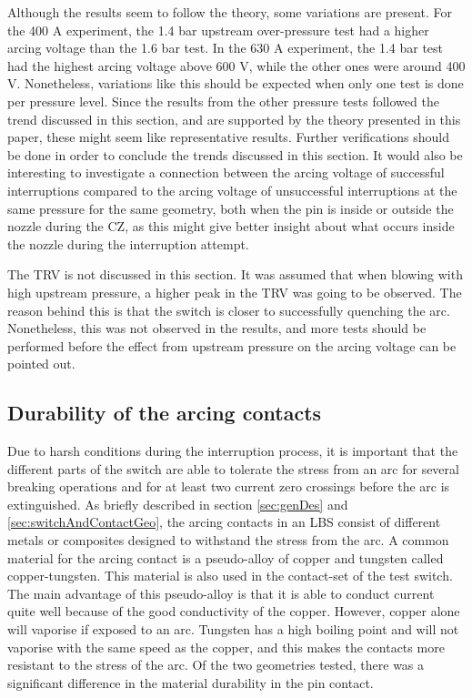 \documentclass[10pt,a4paper,twoside]{article}
\begin{document}
Although the results seem to follow the theory, some variations are present. For the 400 A experiment, the 1.4 bar upstream over-pressure test had a higher arcing voltage than the 1.6 bar test. In the 630 A experiment, the 1.4 bar test had the highest arcing voltage above 600 V, while the other ones were around 400 V. Nonetheless, variations like this should be expected when only one test is done per pressure level. Since the results from the other pressure tests followed the trend discussed in this section, and are supported by the theory presented in this paper, these might seem like representative results. Further verifications should be done in order to conclude the trends discussed in this section. It would also be interesting to investigate a connection between the arcing voltage of successful interruptions compared to the arcing voltage of unsuccessful interruptions at the same pressure for the same geometry, both when the pin is inside or outside the nozzle during the CZ, as this might give better insight about what occurs inside the nozzle during the interruption attempt.

The TRV is not discussed in this section. It was assumed that when blowing with high upstream pressure, a higher peak in the TRV was going to be observed. The reason behind this is that the switch is closer to successfully quenching the arc. Nonetheless, this was not observed in the results, and more tests should be performed before the effect from upstream pressure on the arcing voltage can be pointed out. 

\subsection{Durability of the arcing contacts} \label{fig:durability}

Due to harsh conditions during the interruption process, it is important that the different parts of the switch are able to tolerate the stress from an arc for several breaking operations and for at least two current zero crossings before the arc is extinguished. As briefly described in section \ref{sec:genDes} and \ref{sec:switchAndContactGeo}, the arcing contacts in an LBS consist of different metals or composites designed to withstand the stress from the arc. A common material for the arcing contact is a pseudo-alloy of copper and tungsten called copper-tungsten. This material is also used in the contact-set of the test switch. The main advantage of this pseudo-alloy is that it is able to conduct current quite well because of the good conductivity of the copper. However, copper alone will vaporise if exposed to an arc. Tungsten has a high boiling point and will not vaporise with the same speed as the copper, and this makes the contacts more resistant to the stress of the arc. Of the two geometries tested, there was a significant difference in the material durability in the pin contact.
\end{document}
